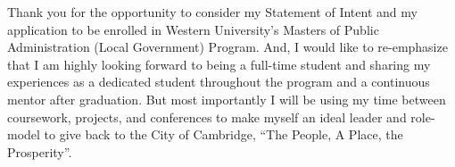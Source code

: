 \documentclass[11pt, a4paper]{awesome-cv}
\begin{document}
\begin{cvletter}
Thank you for the opportunity to consider my Statement of Intent and my application to be enrolled in Western University's Masters of Public Administration (Local Government) Program. And, I would like to re-emphasize that I am highly looking forward to being a full-time student and sharing my experiences as a dedicated student throughout the program and a continuous mentor after graduation. But most importantly I will be using my time between coursework, projects, and conferences to make myself an ideal leader and role-model to give back to the City of Cambridge, “The People, A Place, the Prosperity”.
\end{cvletter}


\makeletterclosing
\end{document}
